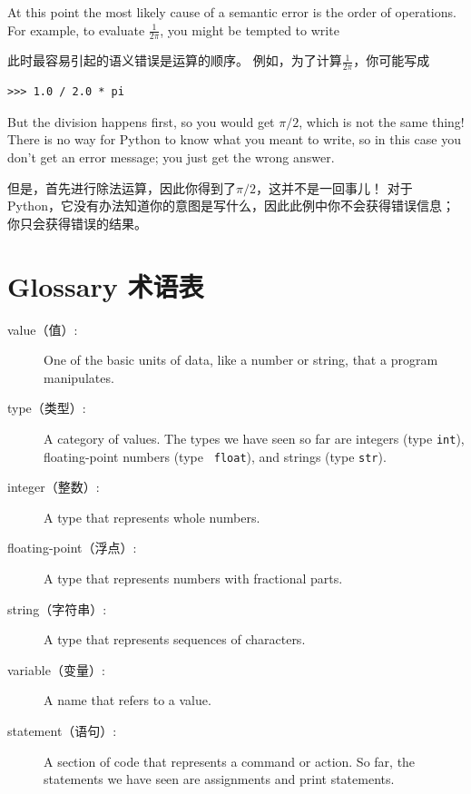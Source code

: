 \documentclass[10pt]{book}
\begin{document}
\begin{CJK}{UTF8}{gbsn}
At this point the most likely cause of a semantic error is
the order of operations.  For example, to evaluate
 $\frac{1}{2 \pi}$,
you might be tempted to write

此时最容易引起的语义错误是运算的顺序。
例如，为了计算$\frac{1}{2 \pi}$，你可能写成

\begin{verbatim}
>>> 1.0 / 2.0 * pi
\end{verbatim}
%
But the division happens first, so you would get $\pi / 2$, which
is not the same thing!  There is no way for Python
to know what you meant to write, so in this case you don't
get an error message; you just get the wrong answer.

但是，首先进行除法运算，因此你得到了$\pi / 2$，这并不是一回事儿！
对于Python，它没有办法知道你的意图是写什么，因此此例中你不会获得错误信息；
你只会获得错误的结果。

\section{Glossary 术语表}

\begin{description}

\item[value（值）:]  One of the basic units of data, like a number or string, 
that a program manipulates.

\item[type（类型）:] A category of values.  The types we have seen so far
are integers (type {\tt int}), floating-point numbers (type {\tt
float}), and strings (type {\tt str}).

\item[integer（整数）:] A type that represents whole numbers.

\item[floating-point（浮点）:] A type that represents numbers with fractional
parts.

\item[string（字符串）:] A type that represents sequences of characters.

\item[variable（变量）:]  A name that refers to a value.

\item[statement（语句）:]  A section of code that represents a command or action.  So
far, the statements we have seen are assignments and print statements.


\end{description}
\end{CJK}
\end{document}
